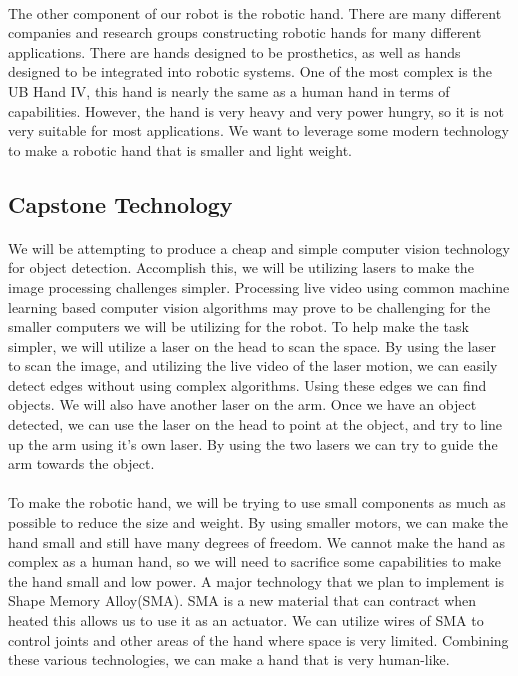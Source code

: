 \documentclass[letterpaper]{article}
\begin{document}
\paragraph{} The other component of our robot is the robotic hand. There are
many different companies and research groups constructing robotic hands for
many different applications. There are hands designed to be prosthetics, as
well as hands designed to be integrated into robotic systems. One of the most
complex is the UB Hand IV, this hand is nearly the same as a human hand in
terms of capabilities. However, the hand is very heavy and very power hungry,
so it is not very suitable for most applications\cite{Melchiorri2013}. We want
to leverage some modern technology to make a robotic hand that is smaller and
light weight.

\subsection{Capstone Technology} \paragraph{} We will be attempting to produce
a cheap and simple computer vision technology for object detection. Accomplish
this, we will be utilizing lasers to make the image processing challenges
simpler. Processing live video using common machine learning based computer
vision algorithms may prove to be challenging for the smaller computers we will
be utilizing for the robot. To help make the task simpler, we will utilize a
laser on the head to scan the space. By using the laser to scan the image, and
utilizing the live video of the laser motion, we can easily detect edges
without using complex algorithms. Using these edges we can find objects. We
will also have another laser on the arm. Once we have an object detected, we
can use the laser on the head to point at the object, and try to line up the
arm using it's own laser. By using the two lasers we can try to guide the arm
towards the object.

\paragraph{} To make the robotic hand, we will be trying to use small
components as much as possible to reduce the size and weight. By using smaller
motors, we can make the hand small and still have many degrees of freedom. We
cannot make the hand as complex as a human hand, so we will need to sacrifice
some capabilities to make the hand small and low power. A major technology that
we plan to implement is Shape Memory Alloy(SMA). SMA is a new material that can
contract when heated this allows us to use it as an actuator. We can utilize
wires of SMA to control joints and other areas of the hand where space is very
limited. Combining these various technologies, we can make a hand that is very
human-like.
\end{document}
